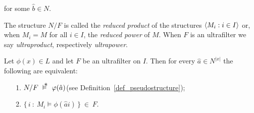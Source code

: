 \documentclass[creche.tex]{subfiles}
\begin{document}
\quad for some $\hat b\in N$.

\smallskip
The structure $N/F$ is called the \emph{reduced product\/} of the structures $\langle M_i:i\in I\rangle$ or, when $M_i=M$ for all $i\in I$, the \emph{reduced power\/} of $M$. When $F$ is an ultrafilter we say \emph{ultraproduct}, respectively \emph{ultrapower}.

\begin{void_thm}[\L o\'{s}'s Theorem]\label{thm_los}
Let $\phi(x)\in L$ and let $F$ be an ultrafilter on $I$. Then for every $\hat a\in N^{|x|}$ the following are equivalent:
\begin{itemize}
\item[1.] $N/F\ \pmodels\ \phi(\hat a)$\hfill (see  Definition~\ref{def_pseudostructure});
\item[2.] $\big\{\,i\ :\ M_i\models \phi(\hat a i)\,\big\}\ \in\ F$.
\end{itemize}
\end{void_thm}
\end{document}
